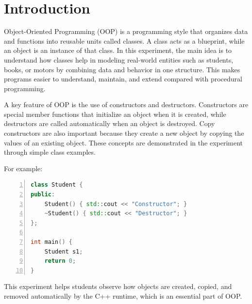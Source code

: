 \section{Introduction}

Object-Oriented Programming (OOP) is a programming style that organizes data and functions into reusable units called classes. A class acts as a blueprint, while an object is an instance of that class. In this experiment, the main idea is to understand how classes help in modeling real-world entities such as students, books, or motors by combining data and behavior in one structure. This makes programs easier to understand, maintain, and extend compared with procedural programming.

A key feature of OOP is the use of constructors and destructors. Constructors are special member functions that initialize an object when it is created, while destructors are called automatically when an object is destroyed. Copy constructors are also important because they create a new object by copying the values of an existing object. These concepts are demonstrated in the experiment through simple class examples.

For example:
\begin{lstlisting}[language=C++, numbers=left]
class Student {
public:
    Student() { std::cout << "Constructor"; }
    ~Student() { std::cout << "Destructor"; }
};

int main() {
    Student s1;
    return 0;
}
\end{lstlisting}

This experiment helps students observe how objects are created, copied, and removed automatically by the C++ runtime, which is an essential part of OOP.
